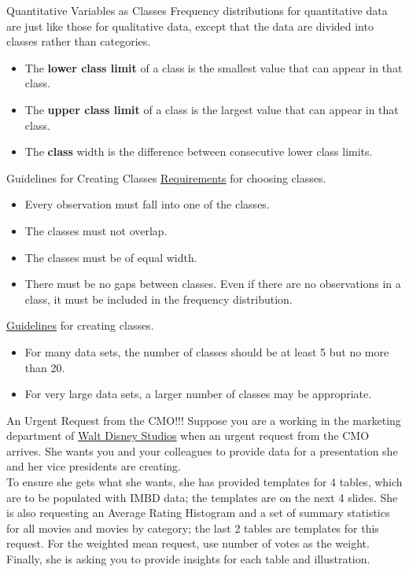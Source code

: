 \documentclass[pdf]{beamer}
\newcommand{\empr}[1]{{\color{franklinblue}\textbf{#1}}}
\theoremstyle{remark}
\theoremstyle{definition}
\begin{document}
\begin{frame}[t]{Quantitative Variables as Classes}
Frequency distributions for quantitative data are just like those for qualitative data, except that the data are divided into classes rather than categories. \\
\vspace{1.0ex}
\begin{itemize}
\item The \empr{lower class limit} of a class is the smallest value that can appear in that class.
\item The \empr{upper class limit} of a class is the largest value that can appear in that class.
\item The \empr{class} width is the difference between consecutive lower class limits.
\end{itemize}
\end{frame}

\begin{frame}[t]{Guidelines for Creating Classes}
\underline{Requirements} for choosing classes.  \\
\vspace{1.5ex}
\begin{itemize}
\item Every observation must fall into one of the classes.
\item The classes must not overlap.
\item The classes must be of equal width.
\item There must be no gaps between classes. Even if there are no observations in a class, it must be included in the frequency distribution.
\end{itemize}
\underline{Guidelines} for creating classes. \\
\vspace{1.5ex}
\begin{itemize}
\item For many data sets, the number of classes should be at least 5 but no more than 20.
\item For very large data sets, a larger number of classes may be appropriate.
\end{itemize}
\end{frame}

\begin{frame}[t]{An Urgent Request from the CMO!!!}
Suppose you are a working in the marketing department of \href{https://www.disneystudios.com/\#/about}{Walt Disney Studios} when an urgent request from the CMO arrives.  She wants you and your colleagues to provide data for a presentation she and her vice presidents are creating.  \\
\vspace{1.5ex}
To ensure she gets what she wants, she has provided templates for 4 tables, which are to be populated with IMBD data; the templates are on the next 4 slides. She is also requesting an Average Rating Histogram and a set of summary statistics for all movies and movies by category;  the last 2 tables are templates for this request.  For the weighted mean request, use number of votes as the weight. Finally, she is asking you to provide insights for each table and illustration. 
\end{frame}
\end{document}
